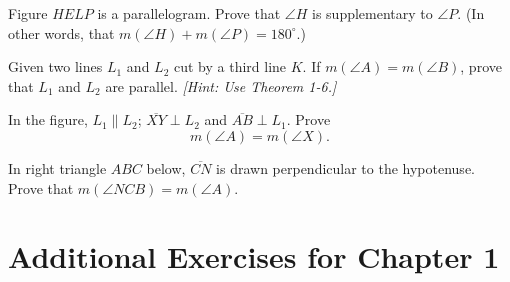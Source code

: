 \documentclass[12pt]{book} %
\begin{document}
\begin{ExerciseList}
	
	\Exercise Figure $HELP$ is a parallelogram. Prove that $\angle H$ is supplementary to $\angle P$. (In other words, that $m(\angle H)+m(\angle P)=180^\circ$.)
	
	
	\Exercise Given two lines $L_1$ and $L_2$ cut by a third line $K$. If $m(\angle A)=m(\angle B)$, prove that $L_1$ and $L_2$ are parallel. \textit{[Hint: Use Theorem 1-6.]}
	
	
	\Exercise In the figure, $L_1\parallel L_2$; $\overline{XY}\perp L_2$ and $\overline{AB}\perp L_1$. Prove
	\[
	m(\angle A)=m(\angle X).
	\]
	
	
	\Exercise In right triangle $ABC$ below, $\overline{CN}$ is drawn perpendicular to the hypotenuse. Prove that $m(\angle NCB)=m(\angle A)$.
	
\end{ExerciseList}

\section*{Additional Exercises for Chapter 1}
\end{document}
